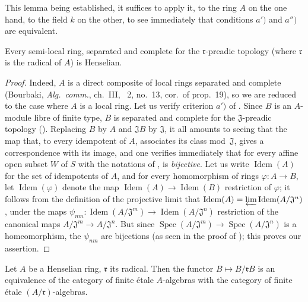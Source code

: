 This lemma being established, it suffices to apply it, to the ring $A$ on the one hand, to the field $k$ on the other, to see immediately that conditions $a')$ and $a'')$ are equivalent.

\begin{proposition}[18.5.14]
\label{IV.18.5.14}
Every semi-local ring, separated and complete for the $\mathfrak{r}$-preadic topology (where $\mathfrak{r}$ is the radical of $A$) is Henselian.
\end{proposition}

\begin{proof}
Indeed, $A$ is a direct composite of local rings separated and complete (Bourbaki, \emph{Alg.\ comm.}, ch.~III, \textsection~2, no.~13, cor.\ of prop.~19), so we are reduced to the case where $A$ is a local ring.
Let us verify criterion $a')$ of .
Since $B$ is an $A$-module libre of finite type, $B$ is separated and complete for the $\mathfrak{J}$-preadic topology ().
Replacing $B$ by $A$ and $\mathfrak{J}B$ by $\mathfrak{J}$, it all amounts to seeing that the map that, to every idempotent of $A$, associates its class mod~$\mathfrak{J}$, gives a correspondence with its image, and one verifies immediately that for every affine open subset $W$ of $S$ with the notations of , is \emph{bijective}.
Let us write $\operatorname{Idem}(A)$ for the set of idempotents of $A$, and for every homomorphism of rings $\varphi:A\to B$, let $\operatorname{Idem}(\varphi)$ denote the map $\operatorname{Idem}(A)\to\operatorname{Idem}(B)$ restriction of $\varphi$;
it follows from the definition of the projective limit that $\operatorname{Idem}(A)=\varprojlim\operatorname{Idem}(A/\mathfrak{J}^n)$, under the maps $\psi_{nm}:\operatorname{Idem}(A/\mathfrak{J}^m)\to\operatorname{Idem}(A/\mathfrak{J}^n)$ restriction of the canonical maps $A/\mathfrak{J}^m\to A/\mathfrak{J}^n$.
But since $\operatorname{Spec}(A/\mathfrak{J}^m)\to\operatorname{Spec}(A/\mathfrak{J}^n)$ is a homeomorphism, the $\psi_{nm}$ are bijections (as seen in the proof of );
this proves our assertion.
\end{proof}

\begin{proposition}[18.5.15]
\label{IV.18.5.15}
Let $A$ be a Henselian ring, $\mathfrak{r}$ its radical.
Then the functor $B\mapsto B/\mathfrak{r}B$ is an equivalence of the category of finite \'etale $A$-algebras with the category of finite \'etale $(A/\mathfrak{r})$-algebras.
\end{proposition}

